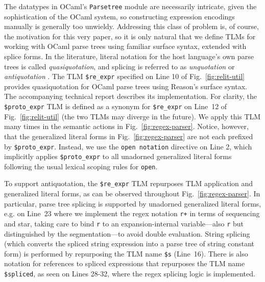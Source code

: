 \documentclass[acmsmall]{acmart}
\newcommand{\li}[1]{\lstinline[basicstyle=\ttfamily\fontsize{9pt}{1em}\selectfont]{#1}}
\begin{document}
The datatypes in OCaml's \li{Parsetree} module are necessarily intricate, given the sophistication of the OCaml system, so constructing expression encodings manually is generally too unwieldy. Addressing this class of problem is, of course, the motivation for this very paper, so it is only natural that we define TLMs  for working with OCaml parse trees using familiar surface syntax, extended with splice forms. In the literature, literal notation for the host language's own parse trees is called \emph{quasiquotation}, and splicing is referred to as \emph{unquotation} or \emph{antiquotation} \cite{Bawd99a,shabalin2013quasiquotes,mainland2007s}. The TLM \li{$re_expr}  specified on Line 10 of Fig.~\ref{fig:relit-util} provides quasiquotation for OCaml parse trees using Reason's surface syntax. The accompanying technical report describes its implementation. For clarity, the \li{$proto_expr} TLM is defined as a synonym for \li{$re_expr} on Line~12 of Fig.~\ref{fig:relit-util} (the two TLMs may diverge in the future). We apply this TLM many times in the semantic actions in Fig.~\ref{fig:regex-parser}. Notice, however, that the generalized literal forms in Fig.~\ref{fig:regex-parser} are not each prefixed by \li{$proto_expr}. Instead, we use the \li{open notation} directive on Line 2, which implicitly applies \li{$proto_expr} to all unadorned generalized literal forms following the usual lexical scoping rules for \li{open}. 

To support antiquotation, the \li{$re_expr} TLM repurposes TLM application and generalized literal forms, as can be observed throughout Fig.~\ref{fig:regex-parser}. In particular, parse tree splicing is supported by unadorned generalized literal forms, e.g. on Line~23 where we implement the regex notation \li{r+} in terms of sequencing and star, taking care to bind \li{r} to an expansion-internal variable---also \li{r} but distinguished by the segmentation---to avoid double evaluation. String splicing (which converts the spliced string expression into a parse tree of string constant form) is performed by repurposing the TLM name \li{$s} (Line~16). There is also notation for references to spliced expressions that repurposes the TLM name \li{$spliced}, as seen on Lines 28-32, where the regex splicing logic is implemented. 
\end{document}

